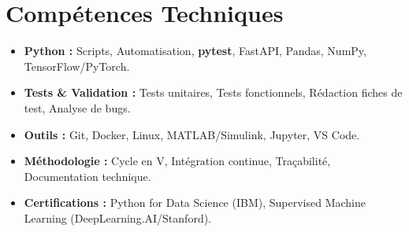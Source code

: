 \documentclass[a4paper,11pt]{article}
\begin{document}
\section{Compétences Techniques}
\begin{itemize}[leftmargin=*, nosep]
    \item \small{\textbf{Python :} Scripts, Automatisation, \textbf{pytest}, FastAPI, Pandas, NumPy, TensorFlow/PyTorch.}
    \item \small{\textbf{Tests \& Validation :} Tests unitaires, Tests fonctionnels, Rédaction fiches de test, Analyse de bugs.}
    \item \small{\textbf{Outils :} Git, Docker, Linux, MATLAB/Simulink, Jupyter, VS Code.}
    \item \small{\textbf{Méthodologie :} Cycle en V, Intégration continue, Traçabilité, Documentation technique.}
    \item \small{\textbf{Certifications :} Python for Data Science (IBM), Supervised Machine Learning (DeepLearning.AI/Stanford).}
\end{itemize}

\end{document}

